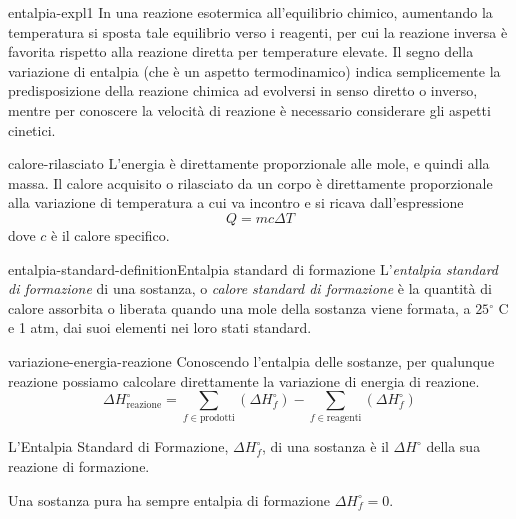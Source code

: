 \documentclass[preview]{standalone}
\begin{document}
\begin{snippet}{entalpia-expl1}
    In una reazione esotermica all'equilibrio chimico,
    aumentando la temperatura si sposta tale equilibrio verso i reagenti,
    per cui la reazione inversa è favorita rispetto alla reazione diretta
    per temperature elevate. Il segno della variazione di entalpia
    (che è un aspetto termodinamico) indica semplicemente la predisposizione della
    reazione chimica ad evolversi in senso diretto o inverso,
    mentre per conoscere la velocità di reazione è necessario considerare gli aspetti cinetici.
\end{snippet}

\begin{snippet}{calore-rilasciato}
    L'energia è direttamente proporzionale alle mole, e quindi alla massa.
    Il calore acquisito o rilasciato da un corpo è direttamente proporzionale
    alla variazione di temperatura a cui va incontro e si ricava dall'espressione
    \[
        Q = mc\Delta T
    \]
    dove \(c\) è il calore specifico.
\end{snippet}

\begin{snippetdefinition}{entalpia-standard-definition}{Entalpia standard di formazione}
    L'\textit{entalpia standard di formazione}
    di una sostanza, o \textit{calore standard di formazione}
    è la quantità di calore assorbita o liberata quando una mole della sostanza
    viene formata, a \(25 {}^\circ \) C e 1 atm, dai suoi elementi nei loro stati standard.
\end{snippetdefinition}

\begin{snippet}{variazione-energia-reazione}
    Conoscendo l'entalpia delle sostanze, per qualunque
    reazione possiamo calcolare direttamente la variazione di energia di reazione.
    \[
        \Delta H^\circ_{\text{reazione}} =
        \sum_{f \in \text{prodotti}} \left( \Delta H^\circ_f \right) -
        \sum_{f \in \text{reagenti}} \left( \Delta H^\circ_f \right) 
    \]

    L'Entalpia Standard di Formazione,
    \(\Delta H^\circ_f\), di una sostanza è il \(\Delta H^\circ\)
    della sua reazione di formazione.

    Una sostanza pura ha sempre entalpia di formazione \(\Delta H^\circ_f = 0\).
\end{snippet}
\end{document}
